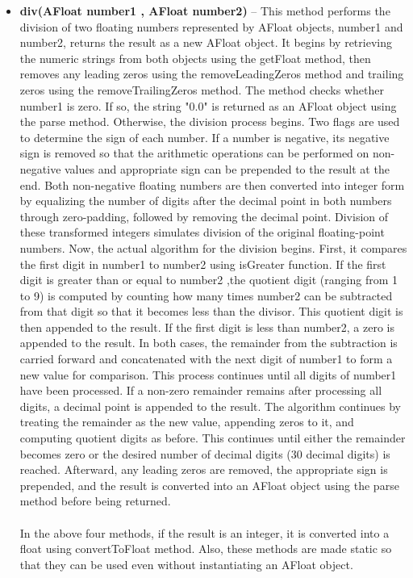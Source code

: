 \documentclass[a4paper,12pt]{article}
\begin{document}
\begin{itemize}
    \item \textbf{div(AFloat number1 , AFloat number2)} -- This method performs the division of two floating numbers represented by AFloat objects, number1 and number2, returns the result as a new AFloat object. It begins by retrieving the numeric strings from both objects using the getFloat method, then removes any leading zeros using the removeLeadingZeros method and trailing zeros using the removeTrailingZeros method. The method checks whether number1 is zero. If so, the string "0.0" is returned as an AFloat object using the parse method. Otherwise, the division process begins. Two flags are used to determine the sign of each number. If a number is negative, its negative sign is removed so that the arithmetic operations can be performed on non-negative values and appropriate sign can be prepended to the result at the end. Both non-negative floating numbers are then converted into integer form by equalizing the number of digits after the decimal point in both numbers through zero-padding, followed by removing the decimal point. Division of these transformed integers simulates division of the original floating-point numbers. Now, the actual algorithm for the division begins. First, it compares the first digit in number1 to number2 using isGreater function. If the first digit is greater than or equal to number2 ,the quotient digit (ranging from 1 to 9) is computed by counting how many times number2 can be subtracted from that digit so that it becomes less than the divisor. This quotient digit is then appended to the result. If the first digit is less than number2, a zero is appended to the result. In both cases, the remainder from the subtraction is carried forward and concatenated with the next digit of number1 to form a new value for comparison. This process continues until all digits of number1 have been processed. If a non-zero remainder remains after processing all digits, a decimal point is appended to the result. The algorithm continues by treating the remainder as the new value, appending zeros to it, and computing quotient digits as before. This continues until either the remainder becomes zero or the desired number of decimal digits (30 decimal digits) is reached. Afterward, any leading zeros are removed, the appropriate sign is prepended, and the result is converted into an AFloat object using the parse method before being returned.\\\\
    In the above four methods, if the result is an integer, it is converted into a float using convertToFloat method. Also, these methods are made static so that they can be used even without instantiating an AFloat object.\\
\end{itemize}
\end{document}
